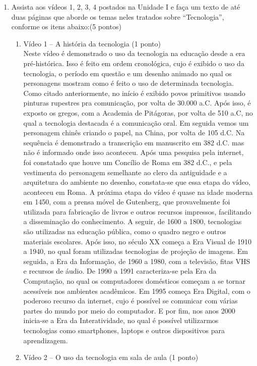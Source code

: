 \documentclass[a4paper, 12pt]{article}
\begin{document}
\begin{enumerate}
\item Assista aos vídeos 1, 2, 3, 4  postados na Unidade I e faça um texto de até duas páginas que aborde os temas neles tratados sobre “Tecnologia”, conforme os itens abaixo:(5 pontos)
  \begin{enumerate}
  \item Vídeo 1 – A história da tecnologia (1 ponto) \\    
    Neste vídeo é demonstrado o uso da tecnologia na educação desde a era pré-histórica. Isso é feito em ordem cronológica, cujo é exibido o uso da tecnologia, o período em questão e um desenho animado no qual os personagens mostram como é feito o uso de determinada tecnologia. \\
    Como citado anteriormente, no início é exibido povos primitivos usando pinturas rupestres pra comunicação, por volta de 30.000 a.C. Após isso, é exposto os gregos, com a Academia de Pitágoras, por volta de 510 a.C, no qual a tecnologia destacada é a comunicação oral. Em seguida vemos um personagem chinês criando o papel, na China, por volta de 105 d.C. Na sequência é demonstrado a transcrição em manuscrito em 382 d.C. mas não é informado onde isso aconteceu. Após uma pesquisa pela internet, foi constatado que houve um Concílio de Roma em 382 d.C., e pela vestimenta do personagem semelhante ao clero da antiguidade e a arquitetura do ambiente no desenho, constata-se que essa etapa do vídeo, aconteceu em Roma. A próxima etapa do vídeo é quase na idade moderna em 1450, com a prensa móvel de Gutenberg, que provavelmente foi utilizada para fabricação de livros e outros recursos impressos, facilitando a disseminação do conhecimento. A seguir, de 1600 a 1800, tecnologias são utilizadas na educação pública, como o quadro negro e outros materiais escolares. Após isso, no século XX começa a Era Visual de 1910 a 1940, no qual foram utilizadas tecnologias de projeção de imagens. Em seguida, a Era da Informação, de 1960 a 1980, com a televisão, fitas VHS e recursos de áudio. De 1990 a 1991 caracteriza-se pela Era da Computação, no qual os computadores domésticos começam a se tornar acessíveis nos ambientes acadêmicos. Em 1995 começa Era Digital, com o poderoso recurso da internet, cujo é possível se comunicar com várias partes do mundo por meio do computador. E por fim, nos anos 2000 inicia-se a Era da Interatividade, no qual é possível utilizarmos tecnologias como smartphones, laptops e outros dispositivos para aprendizagem.  \\
  \item Vídeo 2 – O uso da tecnologia em sala de aula (1 ponto) \\

\end{enumerate}
\end{enumerate}
\end{document}
